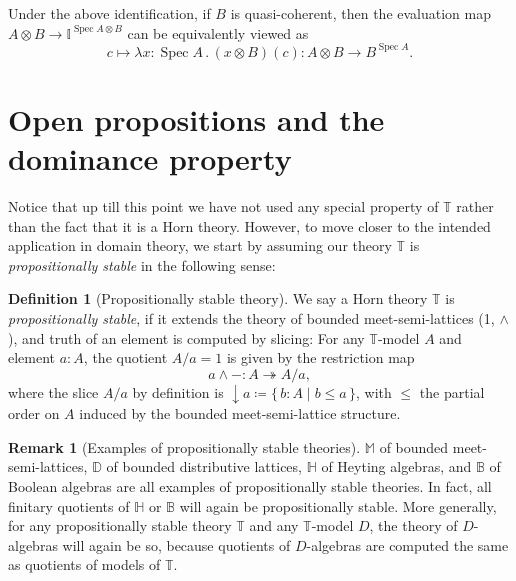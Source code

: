 \documentclass[a4paper,12pt]{amsart}
\theoremstyle{definition}
\newtheorem{definition}[theorem]{Definition}
\newtheorem{remark}[theorem]{Remark}
\newcommand{\mbb}[1]{\mathbb{#1}}
\newcommand{\T}{\mbb T}
\newcommand{\I}{\mbb I}
\newcommand{\scomp}[2]{\{\,#1\mid#2\,\}}
\newcommand{\surj}{\twoheadrightarrow}
\newcommand{\cv}{\operatorname{\downarrow}}
\newcommand{\ld}[2]{\lambda #1\!\colon\!\!#2\mathpunct{.}}
\newcommand{\spec}{\operatorname{Spec}}
\begin{document}
Under the above identification, if $B$ is quasi-coherent, then the evaluation map $A \otimes B \to \I^{\spec A \otimes B}$ can be equivalently viewed as
\[ c \mapsto \ld{x}{\spec A} (x\otimes B)(c) \colon A \otimes B \to B^{\spec A}. \]


\section{Open propositions and the dominance property}\label{sec:dominance}

Notice that up till this point we have not used any special property of $\T$ rather than the fact that it is a Horn theory. However, to move closer to the intended application in domain theory, we start by assuming our theory $\T$ is \emph{propositionally stable} in the following sense: 

\begin{definition}[Propositionally stable theory]\label{defn:propositional}
  We say a Horn theory $\T$ is \emph{propositionally stable}, if it extends the theory of bounded meet-semi-lattices (1, $\wedge$), and truth of an element is computed by slicing: For any $\T$-model $A$ and element $a:A$, the quotient $A/a=1$ is given by the restriction map
  \[ a \wedge - : A \surj A/a, \]
  where the slice $A/a$ by definition is ${\cv} a \coloneq \scomp{b:A}{b\le a}$, with $\le$ the partial order on $A$ induced by the bounded meet-semi-lattice structure.
\end{definition}


\begin{remark}[Examples of propositionally stable theories]
  $\mbb M$ of bounded meet-semi-lattices, $\mbb D$ of bounded distributive lattices, $\mbb H$ of Heyting algebras, and $\mbb B$ of Boolean algebras are all examples of propositionally stable theories. In fact, all finitary quotients of $\mbb H$ or $\mbb B$ will again be propositionally stable. More generally, for any propositionally stable theory $\T$ and any $\T$-model $D$, the theory of $D$-algebras will again be so, because quotients of $D$-algebras are computed the same as quotients of models of $\T$.
\end{remark}
\end{document}
